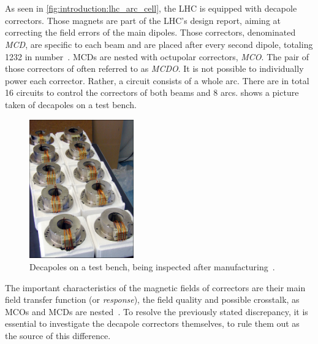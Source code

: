 \section{}

As seen in \cref{fig:introduction:lhc_arc_cell}, the LHC is equipped with decapole correctors. Those
magnets are part of the LHC's design report, aiming at correcting the field errors of the main
dipoles. Those correctors, denominated \textit{MCD}, are specific to each beam and are placed after
every second dipole, totaling 1232 in number~\cite{venturini_delsolaro_magnetic_2005}.  MCDs are
nested with octupolar correctors, \textit{MCO}. The pair of those correctors of often referred to as
\textit{MCDO}. 
It is not possible to individually power each corrector. Rather, a circuit consists of a whole arc.
There are in total 16 circuits to control the correctors of both beams and 8 arcs.
 shows a picture taken of decapoles on a test bench.

\begin{figure}
    \centering
    \includegraphics[width=0.4\textwidth]{./images/decapoles_real_pic.jpg}
    \caption{Decapoles on a test bench, being inspected after
    manufacturing~\cite{noauthor_ten_2001}.}
    \label{fig:decapoles:decapole_picture}
\end{figure}

The important characteristics of the magnetic fields of correctors are their main field transfer
function (or \textit{response}), the field quality and possible crosstalk, as MCOs and MCDs are
nested~\cite{venturini_delsolaro_magnetic_2005}. To resolve the previously stated discrepancy, it is
essential to investigate the decapole correctors themselves, to rule them out as the source of this
difference.

